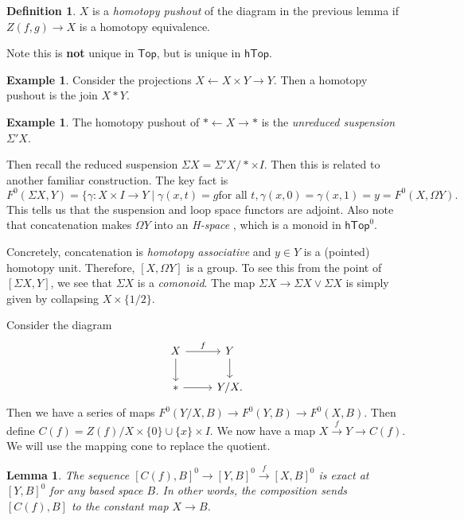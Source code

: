 \documentclass[leqno, openany]{memoir}
\newtheorem{lem}[thm]{Lemma}
\theoremstyle{definition}
\newtheorem{defn}[thm]{Definition}
\newtheorem{exm}[thm]{Example}
\theoremstyle{remark}
\theoremstyle{plain}
\theoremstyle{definition}
\theoremstyle{remark}
\newcommand{\ms}[1]{\mathsf{#1}}
\begin{document}
\begin{defn} $X$ is a \textit{homotopy pushout}  of the diagram in the previous
lemma if $Z(f,g) \to X$ is a homotopy equivalence.  \end{defn}

Note this is \textbf{not} unique in $\ms{Top}$, but is unique in $\ms{hTop}$.

\begin{exm} Consider the projections $X \gets X \times Y \to Y$. Then a
homotopy pushout is the join $X * Y$.  \end{exm}

\begin{exm} The homotopy pushout of $* \gets X \to *$ is the \textit{unreduced
suspension} $\Sigma' X$.  \end{exm}

Then recall the reduced suspension $\Sigma X = \Sigma' X / * \times I$. Then
this is related to another familiar construction. The key fact is \[ F^0(\Sigma
X, Y) = \{ \gamma: X \times I \to Y \mid \gamma(x,t) = g \text{for all $t$},
\gamma(x,0) = \gamma(x,1) = y = F^0(X, \Omega Y). \] This tells us that the
suspension and loop space functors are adjoint.  Also note that concatenation
makes $\Omega Y$ into an \textit{H-space} , which is a monoid in $\ms{hTop}^0$. 

Concretely, concatenation is \textit{homotopy associative} and $y \in Y$ is a
(pointed) homotopy unit. Therefore, $[X, \Omega Y]$ is a group. To see this
from the point of $[\Sigma X, Y]$, we see that $\Sigma X$ is a
\textit{comonoid}. The map $\Sigma X \to \Sigma X \vee \Sigma X$ is simply
given by collapsing $X \times \{ 1/2 \}$.  

Consider the diagram \begin{equation} \begin{tikzcd} X \arrow{r}{f} \arrow{d} &
Y \arrow{d} \\ * \arrow{r} & Y/X.  \end{tikzcd} \end{equation} Then we have a
series of maps $F^0(Y/X,B) \to F^0(Y,B) \to F^0(X,B)$. Then define $C(f) = Z(f)
/ X \times \{0 \} \cup \{x\} \times I$. We now have a map $X \xrightarrow{f} Y
\to C(f)$. We will use the mapping cone to replace the quotient.

\begin{lem} The sequence $[C(f),B]^0 \to [Y,B]^0 \xrightarrow{f} [X,B]^0$ is
exact at $[Y,B]^0$ for any based space $B$. In other words, the composition
sends $[C(f),B]$ to the constant map $X \to B$.  \end{lem}
\end{document}
